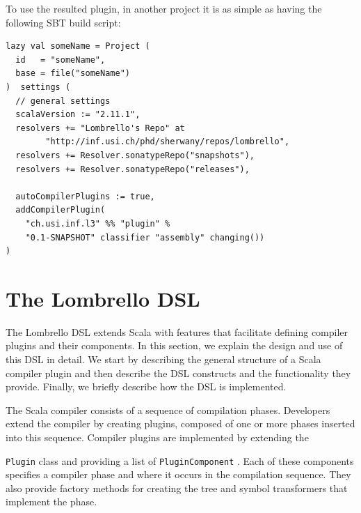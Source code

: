 \documentclass{article}
\renewcommand\c[1]{
  \ifmmode
    \text{#1}
  \else
    \lstinline{#1}
  \fi
}
\begin{document}
\noindent
To use the resulted plugin, in another project it is as simple as having the
following SBT build script:

\begin{verbatim}
lazy val someName = Project (
  id   = "someName",
  base = file("someName")
)  settings (
  // general settings
  scalaVersion := "2.11.1",
  resolvers += "Lombrello's Repo" at 
        "http://inf.usi.ch/phd/sherwany/repos/lombrello",
  resolvers += Resolver.sonatypeRepo("snapshots"),
  resolvers += Resolver.sonatypeRepo("releases"),

  autoCompilerPlugins := true,
  addCompilerPlugin(
    "ch.usi.inf.l3" %% "plugin" % 
    "0.1-SNAPSHOT" classifier "assembly" changing())
) 
\end{verbatim}

\section{The Lombrello DSL}
\label{sec:lombrelloDSL}


The Lombrello DSL extends Scala with features that facilitate defining compiler
plugins and their components. In this section, we explain the design and use of
this DSL in detail. We start by describing the general structure of a Scala
compiler plugin and then describe the DSL constructs and the functionality they
provide. Finally, we briefly describe how the DSL is implemented.

\label{sec:scala_compiler}

The Scala compiler consists of a sequence of compilation phases. Developers
extend the compiler by creating plugins, composed of one or more phases
inserted into this sequence.  Compiler plugins are implemented by extending the
\c{Plugin} class and providing a list of \c{PluginComponent}. Each of these
components specifies a compiler phase and where it occurs in the compilation
sequence. They also provide factory methods for creating the tree and symbol
transformers that implement the phase.
\end{document}
